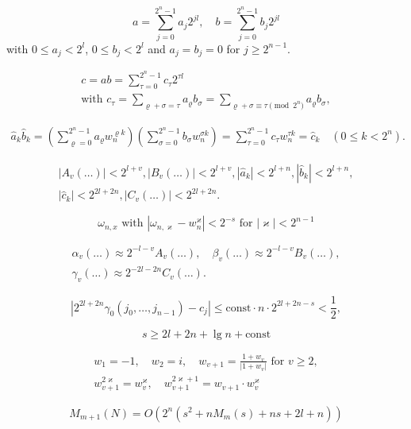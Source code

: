 \documentclass{article}
\begin{document}
\[
\tag{3.2}
a = \sum_{j = 0}^{2^n - 1} a_j 2^{jl}, \quad b = \sum_{j = 0}^{2^n - 1} b_j 2^{jl}
\] with $0 \le a_j < 2^l$, $0 \le b_j < 2^l$ and $a_j = b_j = 0$ for $j \ge 2^{n - 1}$.

\[
\tag{3.3}
\begin{gathered}
c = ab = \sum_{\tau = 0}^{2^n - 1} c_\tau 2^{\tau l} \\
\text{with }c_\tau = \sum_{\varrho + \sigma = \tau} a_\varrho b_\sigma = \sum_{\varrho + \sigma \equiv \tau \pmod{2^n}} a_\varrho b_\sigma,
\end{gathered}
\]

\[
\tag{3.4}
\begin{gathered}
\hat{a}_k \hat{b}_k = \left(\sum_{\varrho = 0}^{2^n - 1} a_\varrho w_n^{\varrho k}\right) \left(\sum_{\sigma = 0}^{2^n - 1} b_\sigma w_n^{\sigma k}\right) = \sum_{\tau = 0}^{2^n - 1} c_\tau w_n^{\tau k} = \hat{c}_k \quad (0 \le k < 2^n).
\end{gathered}
\]

\[
\begin{gathered}
|A_v(\ldots)| < 2^{l + v}, |B_v(\ldots)| < 2^{l + v}, |\hat{a}_k| < 2^{l + n}, |\hat{b}_k| < 2^{l + n}, \\
|\hat{c}_k| < 2^{2l + 2n}, |C_v(\ldots)| < 2^{2l + 2n}.
\end{gathered}
\]

\[
\omega_{n, x}\text{ with }|\omega_{n, \varkappa} - w_n^\varkappa| < 2^{-s}\text{ for }|\varkappa| < 2^{n - 1}
\]

\[
\begin{gathered}
\alpha_v (\ldots) \approx 2^{-l - v} A_v(\ldots), \quad \beta_v(\ldots) \approx 2^{-l - v} B_v(\ldots), \\
\gamma_v(\ldots) \approx 2^{-2l - 2n} C_v (\ldots).
\end{gathered}
\]

\[
\left|2^{2l + 2n} \gamma_0 (j_0, \ldots, j_{n - 1}) - c_j\right| \le \text{const} \cdot n \cdot 2^{2l + 2n - s} < \frac{1}{2},
\]

\[
\tag{3.9}
s \ge 2l + 2n + \lg n + \text{const}
\]

\[
\begin{gathered}
w_1 = -1, \quad w_2 = i, \quad w_{v + 1} = \frac{1 + w_v}{|1 + w_v|}\text{ for }v \ge 2,\\
w_{v + 1}^{2 \varkappa} = w_v^\varkappa, \quad w_{v + 1}^{2\varkappa + 1} = w_{v + 1} \cdot w_v^\varkappa
\end{gathered}
\]

\[
M_{m + 1}(N) = O(2^n (s^2 + n M_m(s) + ns + 2l + n))
\]
\end{document}
